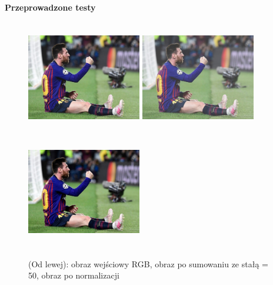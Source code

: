 \documentclass[magisterska,openany]{pracadypl}
\begin{document}
\vspace{0.25cm}\textbf{\Large Przeprowadzone testy}
\vspace{0.5cm}
\begin{figure}[h]
\centering
\includegraphics[width=5cm, height=5cm]{orgi/RGBMessi.jpg}
\includegraphics[width=5cm, height=5cm]{4_1/addconstRGB1.jpg}
\includegraphics[width=5cm, height=5cm]{4_1/naddconstRGB1.jpg}
\caption{(Od lewej): obraz wejściowy RGB, obraz po sumowaniu ze stałą = 50, obraz po normalizacji}
\end{figure}
\end{document}
